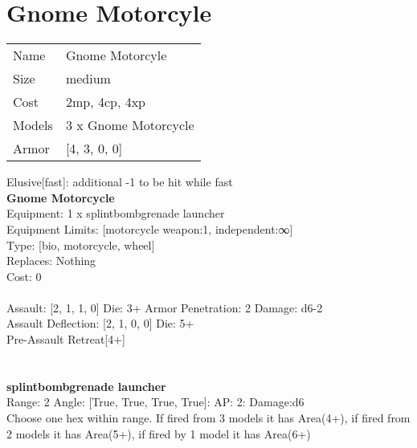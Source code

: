 \pagebreak\pagebreak

\section{ Gnome Motorcyle }

\begin{tabular}{ll}
  Name & Gnome Motorcyle \\
  Size & medium\\
  Cost & 2mp, 4cp, 4xp\\
  Models & 3 x Gnome Motorcycle\\
  Armor & [4, 3, 0, 0]\\
\end{tabular}

\noindent Elusive[fast]: additional -1 to be hit while fast\\ 


{\bf Gnome Motorcycle } \\
Equipment: 1 x splintbombgrenade launcher \\
Equipment Limits: [motorcycle weapon:1, independent:∞] \\
Type: [bio, motorcycle, wheel] \\
Replaces: Nothing \\
Cost: 0\\
\ \\
Assault: [2, 1, 1, 0] Die: 3+ Armor Penetration: 2 Damage: d6-2 \\
Assault Deflection: [2, 1, 0, 0] Die: 5+\\
\indent Pre-Assault Retreat[4+]\\ 
 
\ \\

\ \\
{\bf splintbombgrenade launcher } \\



Range: 2  Angle: [True, True, True, True]: AP: 2: Damage:d6 \\
Choose one hex within range. If fired from 3 models it has Area(4+), if fired from 2 models it has Area(5+), if fired by 1 model it has Area(6+)\\ 




 
\ \\




